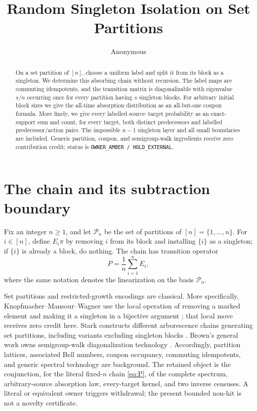 \documentclass[a4paper,10pt]{amsart}
\title[Random singleton isolation]{Random Singleton Isolation on Set Partitions}
\author{Anonymous}
\date{}
\theoremstyle{remark}
\newcommand{\Pn}{\mathcal P_n}
\begin{document}
\begin{abstract}
On a set partition of $[n]$, choose a uniform label and split it from its
block as a singleton.  We determine this absorbing chain without recursion.
The label maps are commuting idempotents, and the transition matrix is
diagonalizable with eigenvalue $s/n$ occurring once for every partition
having $s$ singleton blocks.  For arbitrary initial block sizes we give the
all-time absorption distribution as an all-but-one coupon formula.  More
finely, we give every labelled source--target probability as an exact-support
sum and count, for every target, both distinct predecessors and labelled
predecessor/action pairs.  The impossible $n-1$ singleton layer and all small
boundaries are included.  Generic partition, coupon, and semigroup-walk
ingredients receive zero contribution credit; status is
\texttt{OWNER\_AMBER / HOLD\_EXTERNAL}.
\end{abstract}

\maketitle

\section{The chain and its subtraction boundary}

Fix an integer $n\ge1$, and let $\Pn$ be the set of partitions of
$[n]=\{1,\ldots,n\}$.  For
$i\in[n]$, define $E_i\pi$ by removing $i$ from its block and installing
$\{i\}$ as a singleton; if $\{i\}$ is already a block, do nothing.  The
chain has transition operator
\begin{equation}\label{eq:P}
 P=\frac1n\sum_{i=1}^n E_i,
\end{equation}
where the same notation denotes the linearization on the basis $\Pn$.

Set partitions and restricted-growth encodings are classical.  More
specifically, Knopfmacher--Mansour--Wagner use the local operation of
removing a marked element and making it a singleton in a bijective argument
\cite{KMW2010}; that local move receives zero credit here.  Stark constructs
different arborescence chains generating set partitions, including variants
excluding singleton blocks \cite{Stark2024}.  Brown's general work owns
semigroup-walk diagonalization technology \cite{Brown2000}.  Accordingly,
partition lattices, associated Bell numbers, coupon occupancy, commuting
idempotents, and generic spectral technology are background.  The retained
object is the conjunction, for the literal fixed-$n$ chain \eqref{eq:P}, of
the complete spectrum, arbitrary-source absorption law, every-target kernel,
and two inverse censuses.  A literal or equivalent owner triggers withdrawal;
the present bounded non-hit is not a novelty certificate.
\end{document}

